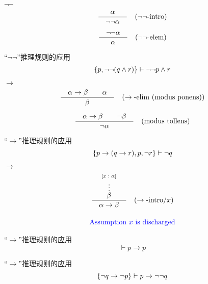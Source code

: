 \begin{frame}{$\lnot\lnot$}
  \[
    \frac{\quad\alpha\quad}{\quad\lnot \lnot \alpha\quad} \quad (\lnot\lnot\text{-intro})
  \]

  \vspace{0.60cm}
  \[
    \frac{\quad\lnot \lnot \alpha\quad}{\quad\alpha\quad} \quad (\lnot\lnot\text{-elem})
  \]
\end{frame}

\begin{frame}{}
  \begin{exampleblock}{``$\lnot\lnot$''推理规则的应用}
    \[
      \{p, \lnot\lnot(q \land r)\} \vdash \lnot\lnot p \land r
    \]
  \end{exampleblock}
\end{frame}

\begin{frame}{$\to$}
  \[
    \frac{\quad\alpha \to \beta \qquad \alpha\quad}{\quad\beta\quad} \quad (\to\text{-elim (modus ponens)})
  \]

  \vspace{0.60cm}
  \[
    \frac{\quad\alpha \to \beta \qquad \lnot \beta\quad}{\quad\lnot \alpha\quad} \quad (\text{modus tollens})
  \]
\end{frame}

\begin{frame}
  \begin{exampleblock}{``$\to$''推理规则的应用}
    \[
      \{p \to (q \to r), p, \lnot r\} \vdash \lnot q
    \]
  \end{exampleblock}
\end{frame}

\begin{frame}{$\to$}
  \begin{gather*}
    \frac{\quad\stackrel{[x \;:\; \alpha]}{\stackrel{\vdots}{\beta}}\quad}{\quad\alpha \to \beta\quad} \quad (\to\text{-intro}/x) \\[10pt]
    \text{\textcolor{blue}{Assumption $x$ is discharged}}
  \end{gather*}
\end{frame}

\begin{frame}{}
  \begin{exampleblock}{``$\to$''推理规则的应用}
    \[
      \vdash p \to p
    \]
  \end{exampleblock}

  \pause
  \vspace{0.80cm}
  \begin{exampleblock}{``$\to$''推理规则的应用}
    \[
      \{\lnot q \to \lnot p\} \vdash p \to \lnot\lnot q
    \]
  \end{exampleblock}
\end{frame}

